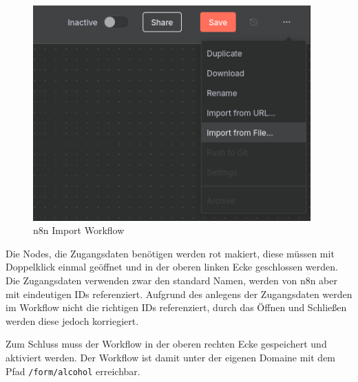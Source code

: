 \begin{figure}
    \begin{center}
        \includegraphics[width=0.95\textwidth]{images/n8n_import.png}
    \end{center}
    \caption{n8n Import Workflow}\label{fig:n8n_import}
\end{figure}

Die Nodes, die Zugangsdaten benötigen werden rot makiert, diese müssen mit Doppelklick einmal
geöffnet und in der oberen linken Ecke geschlossen werden. Die Zugangsdaten verwenden zwar den
standard Namen, werden von n8n aber mit eindeutigen IDs referenziert. Aufgrund des anlegens der
Zugangsdaten werden im Workflow nicht die richtigen IDs referenziert, durch das Öffnen und Schließen
werden diese jedoch korriegiert.

Zum Schluss muss der Workflow in der oberen rechten Ecke gespeichert und aktiviert werden. Der
Workflow ist damit unter der eigenen Domaine mit dem Pfad \verb|/form/alcohol| erreichbar.

